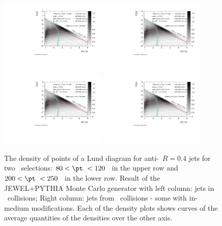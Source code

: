 \begin{figure}[htbp]
	\centering
	\includegraphics[width=0.45\textwidth,page=1]{figures/lund/lund}
	\includegraphics[width=0.45\textwidth,page=2]{figures/lund/lund}
	\includegraphics[width=0.45\textwidth,page=4]{figures/lund/lund}
	\includegraphics[width=0.45\textwidth,page=5]{figures/lund/lund}
	\caption{The density of points of a Lund diagram for anti-\kT\ $R=0.4$ jets for two \pt\ selections: $80 < \pt\ < 120$ \gevc\ in the upper row and $200 < \pt\ < 250$ \gevc\ in the lower row. Result of the JEWEL+PYTHIA Monte Carlo generator with left column: jets in \pp\ collisions; Right column: jets from \PbPb\ collisions - some with in-medium modifications. Each of the density plots shows curves of the average quantities of the densities over the other axis.}
	\label{fig:Lund_jets}
\end{figure}
